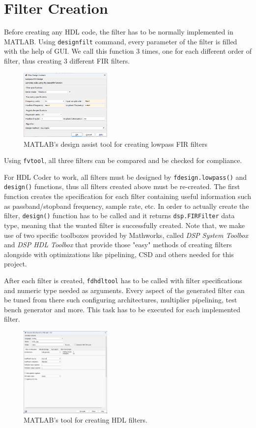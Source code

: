 \section{Filter Creation}
Before creating any HDL code, the filter has to be normally implemented in MATLAB.
Using \verb|designfilt| command, every parameter of the filter is filled with the help of GUI. We call this function 3 times, one for each different order of filter, thus creating 3 different FIR filters.
\begin{figure}[htpb]
    \centering
    \includegraphics[width=0.4\textwidth]{Images/matlab_filter_design_assist_tool.png}
    \caption{MATLAB's design assist tool for creating lowpass FIR filters}
    \label{fig:matlab_filter_design_assist_tool}
\end{figure}
Using \verb|fvtool|, all three filters can be compared and be checked for compliance. 

For HDL Coder to work, all filters must be designed by \verb|fdesign.lowpass()| and \verb|design()| functions, thus all filters created above must be re-created. The first function creates the specification for each filter containing useful information such as passband/stopband frequency, sample rate, etc. In order to actually create the filter, \verb|design()| function has to be called and it returns \verb|dsp.FIRFilter| data type, meaning that the wanted filter is successfully created. Note that, we make use of two specific toolboxes provided by Mathworks, called \emph{DSP System Toolbox} and \emph{DSP HDL Toolbox} that provide those "easy" methods of creating filters alongside with optimizations like pipelining, CSD and others needed for this project. 

After each filter is created, \verb|fdhdltool| has to be called with filter specifications and numeric type needed as arguments.
Every aspect of the generated filter can be tuned from there such configuring architectures, multiplier pipelining, test bench generator and more. This task has to be executed for each implemented filter.

\begin{figure}[htbp]
    \centering
    \includegraphics[width=0.4\textwidth]{Images/matlab_create_hdl.png}
    \caption{MATLAB's tool for creating HDL filters.}
    \label{fig:matlab_create_hdl}
\end{figure}

